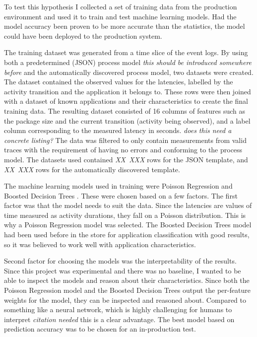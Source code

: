 \documentclass[english,12pt,a4paper,pdftex,sci,utf8]{aaltothesis}
\theoremstyle{definition}
\newcommand{\nyi}[1]{\noindent\colorbox{nyibg}{\textcolor{nyitext}{\emph{#1}}}}
\begin{document}
To test this hypothesis I collected a set of training data from the production environment and used it to train and test machine learning models.
Had the model accuracy been proven to be more accurate than the statistics, the model could have been deployed to the production system.

The training dataset was generated from a time slice of the event logs. 
By using both a predetermined (JSON) process model \nyi{this should be introduced somewhere before} and the automatically discovered process model, two datasets were created. The dataset contained the observed values for the latencies, labelled by the activity transition and the application it belongs to.
These rows were then joined with a dataset of known applications and their characteristics to create the final training data.
The resulting dataset consisted of 16 columns of features such as the package size and the current transition (activity being observed), and a label column corresponding to the measured latency in seconds. \nyi{does this need a concrete listing?}
The data was filtered to only contain measurements from valid traces with the requirement of having no errors and conforming to the process model.
The datasets used contained \nyi{XX~XXX} rows for the JSON template, and \nyi{XX~XXX} rows for the automatically discovered template.

The machine learning models used in training were Poisson Regression \cite{azurepoisson} and Boosted Decision Trees \cite{azurebdt}.
These were chosen based on a few factors.
The first factor was that the model needs to suit the data.
Since the latencies are values of time measured as activity durations, they fall on a Poisson distribution. 
This is why a Poisson Regression model was selected.
The Boosted Decision Trees model had been used before in the store for application classification with good results, so it was believed to work well with application characteristics.

Second factor for choosing the models was the interpretability of the results.
Since this project was experimental and there was no baseline, I wanted to be able to inspect the models and reason about their characteristics.
Since both the Poisson Regression model and the Boosted Decision Trees output the per-feature weights for the model, they can be inspected and reasoned about.
Compared to something like a neural network, which is highly challenging for humans to interpret \nyi{citation needed} this is a clear advantage.
The best model based on prediction accuracy was to be chosen for an in-production test.
\end{document}
